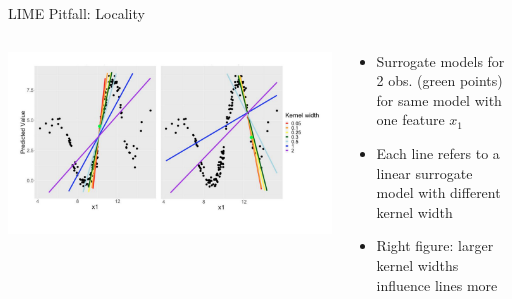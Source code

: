 \documentclass[11pt,compress,t,notes=noshow, aspectratio=169, xcolor=table]{beamer}
\begin{document}
\begin{frame}[c]{LIME Pitfall: Locality}
\begin{itemize}
     \end{itemize}
     \pause
     \begin{columns}[T, totalwidth=\linewidth]
        \begin{column}{0.65\textwidth}
        \includegraphics[width=\textwidth, trim = 0px 0px 30px 40px, clip]{figure/lime_locality}
         \end{column}
         \begin{column}{0.35\textwidth}
         \begin{itemize}
             \item Surrogate models for 2 obs. (green points) for same model with one feature $x_1$
             \item Each line refers to a linear surrogate model with different kernel width
             \item Right figure: larger kernel widths influence lines more
         \end{itemize}
         \end{column}
     \end{columns}
\end{frame}
\end{document}
